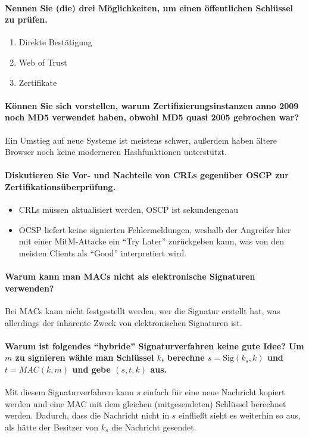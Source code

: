 \documentclass[a4paper, 11pt, accentcolor = tud3b]{tudreport}
\newcommand{\Sig}{\ensuremath{\textrm{Sig}}}
\begin{document}
				\paragraph{Nennen Sie (die) drei Möglichkeiten, um einen öffentlichen Schlüssel zu prüfen.}
				\begin{enumerate}
					\item Direkte Bestätigung
					\item Web of Trust
					\item Zertifikate
				\end{enumerate}
				
				\paragraph{Können Sie sich vorstellen, warum Zertifizierungsinstanzen anno 2009 noch MD5 verwendet haben, obwohl MD5 quasi 2005 gebrochen war?}
				Ein Umstieg auf neue Systeme ist meistens schwer, außerdem haben ältere Browser noch keine moderneren Hashfunktionen unterstützt.
				
				\paragraph{Diskutieren Sie Vor- und Nachteile von CRLs gegenüber OSCP zur Zertifikationsüberprüfung.}
				\begin{itemize}
					\item CRLs müssen aktualisiert werden, OSCP ist sekundengenau
					\item OCSP liefert keine signierten Fehlermeldungen, weshalb der Angreifer hier mit einer MitM-Attacke ein \enquote{Try Later} zurückgeben kann, was von den meisten Clients als \enquote{Good} interpretiert wird.
				\end{itemize}
				
				\paragraph{Warum kann man MACs nicht als elektronische Signaturen verwenden?}
				Bei MACs kann nicht festgestellt werden, wer die Signatur erstellt hat, was allerdings der inhärente Zweck von elektronischen Signaturen ist.
				
				\paragraph{Warum ist folgendes \enquote{hybride} Signaturverfahren keine gute Idee? Um \(m\) zu signieren wähle man Schlüssel \(k\), berechne \(s = \Sig(k_s, k) \) und \(t = MAC(k, m)\) und gebe \((s, t, k)\) aus.}
				Mit diesem Signaturverfahren kann \(s\) einfach für eine neue Nachricht kopiert werden und eine MAC mit dem gleichen (mitgesendeten) Schlüssel berechnet werden. Dadurch, dass die Nachricht nicht in \(s\) einfließt sieht es weiterhin so aus, als hätte der Besitzer von \(k_s\) die Nachricht gesendet.
				
\end{document}
